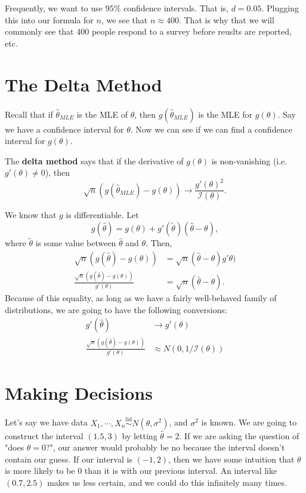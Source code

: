 \documentclass[titlepage, 12pt, leqno]{article}
\begin{document}
Frequently, we want to use $95\%$ confidence intervals. That is, $d=0.05$.
Plugging this into our formula for $n$, we see that $n\approx400$. That is why
that we will commonly see that 400 people respond to a survey before reuslts
are reported, etc.

\pagebreak
\section{The Delta Method}
Recall that if $\hat \theta_{MLE}$ is the MLE of $\theta$, then $g(\hat
\theta_{MLE})$ is the MLE for $g(\theta)$. Say we have a confidence interval
for $\theta$. Now we can see if we can find a confidence interval for
$g(\theta)$. 

\begin{definition}
    The \textbf{delta method} says that if the derivative of $g(\theta)$ is
    non-vanishing (i.e. $g'(\theta) \ne 0$), then
    \[
    \sqrt{n}(g(\hat \theta_{MLE}) - g(\theta)) \rightarrow 
    \frac{g'(\theta)^{2}}{\mathcal{I}(\theta)}.
    \]
\end{definition}

We know that $g$ is differentiable. Let
\[
g(\hat \theta) = g(\theta) + g'(\tilde{\theta})(\hat \theta - \theta),
\]
where $\tilde{\theta}$ is some value between $\hat \theta$ and $\theta$. Then,
\begin{align*}
    \sqrt{n}(g(\hat \theta) - g(\theta)) &= \sqrt{n}(\hat \theta - \theta)g'
    \theta) \\
    \frac{\sqrt{n}(g(\hat \theta) - g(\theta))}{g'(\theta)}
                                         &= \sqrt{n}(\hat \theta - \theta).
\end{align*}
Because of this equality, as long as we have a fairly well-behaved family of
distributions, we are going to have the following conversions:
\begin{align*}
    g'(\hat \theta) &\rightarrow g'(\theta) \\
    \frac{\sqrt{n}(g(\hat \theta) - g(\theta))}{g'(\theta)} &\approx
    N(0, 1/\mathcal{I}(\theta))
\end{align*}

\pagebreak
\section{Making Decisions}
Let's say we have data $X_{1}, \cdots , X_{n} \overset{\mathrm{iid}}{\sim} N
(\theta, \sigma^{2})$, and $\sigma^{2}$ is known. We are going to construct the
interval $(1.5,3)$ by letting $\hat \theta = 2$. If we are asking the question
of "does $\theta = 0$?", our answer would probably be no because the interval
doesn't contain our guess. If our interval is $(-1,2)$, then we have some
intuition that $\theta$ is more likely to be 0 than it is with our previous
interval. An interval like $(0.7, 2.5)$ makes us less certain, and we could
do this infinitely many times. 
\end{document}
